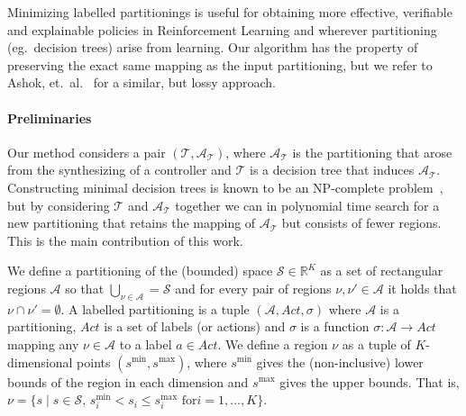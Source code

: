 \documentclass{easychair}
\begin{document}
Minimizing labelled partitionings is useful for obtaining more effective,
verifiable and explainable policies in Reinforcement Learning and wherever
partitioning (eg.\ decision trees) arise from learning. Our algorithm has the
property of preserving the exact same mapping as the input partitioning, but we
refer to Ashok, et.\ al.\ \cite{ashokDtControlDecisionTree2020a} for a similar,
but lossy approach.

\paragraph{Preliminaries} Our method considers a pair $(\mathcal{T},
\mathcal{A}_{\mathcal{T}})$, where $\mathcal{A}_{\mathcal{T}}$ is the
partitioning that arose from the synthesizing of a controller and $\mathcal{T}$
is a decision tree that induces $\mathcal{A}_{\mathcal{T}}$. Constructing
minimal decision trees is known to be an NP-complete
problem~\cite{hyafilConstructingOptimalBinary1976}, but by considering
$\mathcal{T}$ and $\mathcal{A}_{\mathcal{T}}$ together we can in polynomial time
search for a new partitioning that retains the mapping of
$\mathcal{A}_{\mathcal{T}}$ but consists of fewer regions. This is the main
contribution of this work.

We define a partitioning of the (bounded) space $\mathcal{S} \in \mathbb{R}^K$
as a set of rectangular regions $\mathcal{A}$ so that $\bigcup_{\nu \in
\mathcal{A}} = \mathcal{S}$ and for every pair of regions $\nu,\nu' \in
\mathcal{A}$ it holds that $\nu \cap \nu' = \emptyset$. A labelled partitioning
is a tuple $(\mathcal{A}, Act, \sigma)$ where $\mathcal{A}$ is a partitioning,
$Act$ is a set of labels (or actions) and $\sigma$ is a function $\sigma :
\mathcal{A} \rightarrow Act$ mapping any $\nu \in \mathcal{A}$ to a label $a \in
Act$. We define a region $\nu$ as a tuple of $K$-dimensional points $(s^{\min},
s^{\max})$, where $s^{\min}$ gives the (non-inclusive) lower bounds of the
region in each dimension and $s^{\max}$ gives the upper bounds. That is, $\nu =
\{s \mid s \in \mathcal{S}, \, s^{\min}_{i} < s_{i} \leq s^{\max}_{i} \text{ for
} i = 1,\ldots,K \}$.
\end{document}
